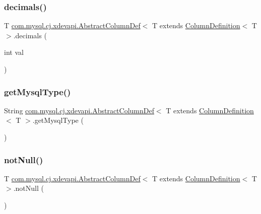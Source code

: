 \subsubsection{\texorpdfstring{decimals()}{decimals()}}
{\footnotesize\ttfamily T \mbox{\hyperlink{classcom_1_1mysql_1_1cj_1_1xdevapi_1_1_abstract_column_def}{com.\+mysql.\+cj.\+xdevapi.\+Abstract\+Column\+Def}}$<$ T extends \mbox{\hyperlink{interfacecom_1_1mysql_1_1cj_1_1protocol_1_1_column_definition}{Column\+Definition}}$<$ T $>$.decimals (\begin{DoxyParamCaption}\item[{int}]{val }\end{DoxyParamCaption})}

\mbox{\label{classcom_1_1mysql_1_1cj_1_1xdevapi_1_1_abstract_column_def_a22068306f5eba4cdc8515ffb4f8fb95a}} 
\subsubsection{\texorpdfstring{get\+Mysql\+Type()}{getMysqlType()}}
{\footnotesize\ttfamily String \mbox{\hyperlink{classcom_1_1mysql_1_1cj_1_1xdevapi_1_1_abstract_column_def}{com.\+mysql.\+cj.\+xdevapi.\+Abstract\+Column\+Def}}$<$ T extends \mbox{\hyperlink{interfacecom_1_1mysql_1_1cj_1_1protocol_1_1_column_definition}{Column\+Definition}}$<$ T $>$.get\+Mysql\+Type (\begin{DoxyParamCaption}{ }\end{DoxyParamCaption})\hspace{0.3cm}{\ttfamily [protected]}}

\mbox{\label{classcom_1_1mysql_1_1cj_1_1xdevapi_1_1_abstract_column_def_aeae3341e23e3d78d7f43cc18aed47265}} 
\subsubsection{\texorpdfstring{not\+Null()}{notNull()}}
{\footnotesize\ttfamily T \mbox{\hyperlink{classcom_1_1mysql_1_1cj_1_1xdevapi_1_1_abstract_column_def}{com.\+mysql.\+cj.\+xdevapi.\+Abstract\+Column\+Def}}$<$ T extends \mbox{\hyperlink{interfacecom_1_1mysql_1_1cj_1_1protocol_1_1_column_definition}{Column\+Definition}}$<$ T $>$.not\+Null (\begin{DoxyParamCaption}{ }\end{DoxyParamCaption})}

